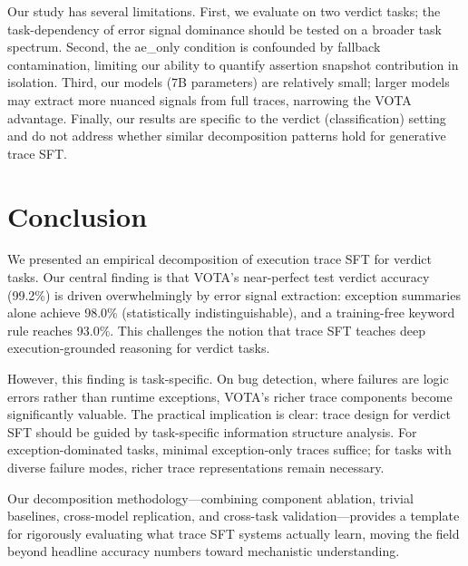 \documentclass[11pt,a4paper]{article}
\begin{document}
Our study has several limitations.
First, we evaluate on two verdict tasks; the task-dependency of error signal dominance should be tested on a broader task spectrum.
Second, the ae\_only condition is confounded by fallback contamination, limiting our ability to quantify assertion snapshot contribution in isolation.
Third, our models (7B parameters) are relatively small; larger models may extract more nuanced signals from full traces, narrowing the VOTA advantage.
Finally, our results are specific to the verdict (classification) setting and do not address whether similar decomposition patterns hold for generative trace SFT.

\section{Conclusion}
\label{sec:conclusion}

We presented an empirical decomposition of execution trace SFT for verdict tasks.
Our central finding is that VOTA's near-perfect test verdict accuracy (99.2\%) is driven overwhelmingly by error signal extraction: exception summaries alone achieve 98.0\% (statistically indistinguishable), and a training-free keyword rule reaches 93.0\%.
This challenges the notion that trace SFT teaches deep execution-grounded reasoning for verdict tasks.

However, this finding is task-specific.
On bug detection, where failures are logic errors rather than runtime exceptions, VOTA's richer trace components become significantly valuable.
The practical implication is clear: trace design for verdict SFT should be guided by task-specific information structure analysis.
For exception-dominated tasks, minimal exception-only traces suffice; for tasks with diverse failure modes, richer trace representations remain necessary.

Our decomposition methodology---combining component ablation, trivial baselines, cross-model replication, and cross-task validation---provides a template for rigorously evaluating what trace SFT systems actually learn, moving the field beyond headline accuracy numbers toward mechanistic understanding.
\end{document}
